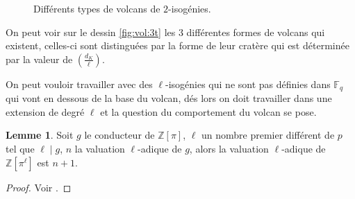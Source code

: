 \documentclass[10pt,a4paper]{book}
\theoremstyle{plain}
\theoremstyle{definition}
\newtheorem{lem}[thm]{Lemme}
\theoremstyle{definition}
\theoremstyle{definition}
\theoremstyle{definition}
\theoremstyle{remark}
\theoremstyle{remark}
\theoremstyle{definition}
\begin{document}
\begin{figure}[h]
\begin{center}
		\end{center}
		\caption{Différents types de volcans de $2$-isogénies.}
\end{figure}
On peut voir sur le dessin \ref{fig:vol:3t} les 3 différentes formes de volcans
qui existent, celles-ci sont distinguées par la forme de leur cratère qui est 
déterminée par la valeur de $\left( \frac{d_K}{\ell} \right)$.

On peut vouloir travailler avec des $\ell$-isogénies qui ne sont pas définies dans $\mathbb{F}_q$ qui vont en dessous de la base du volcan, dés lors on doit travailler dans une extension de degré $\ell$ et la question du comportement du volcan se pose.

\begin{lem}
\label{lem:val:ext}
Soit $g$ le conducteur de $\mathbb{Z}[\pi]$, $\ell$ un nombre premier différent de $p$ tel que $\ell \mid g$, $n$ la valuation $\ell$-adique de $g$, alors la valuation $\ell$-adique de $\mathbb{Z}[\pi^{\ell}]$ est $n+1$. 
\end{lem}

\begin{proof}
Voir \cite[Proposition 6]{MiretMSTV08}.
\end{proof}
\end{document}
